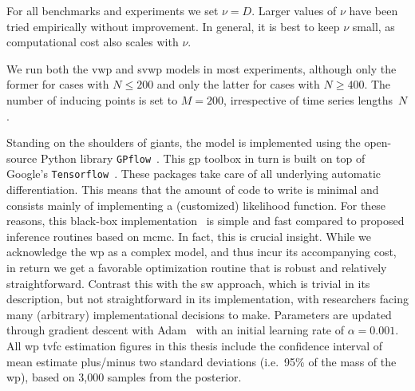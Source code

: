 For all benchmarks and experiments we set $\nu = D$.
Larger values of $\nu$ have been tried empirically without improvement.
In general, it is best to keep $\nu$ small, as computational cost also scales with $\nu$.

We run both the \gls{vwp} and \gls{svwp} models in most experiments, although only the former for cases with $N \leq 200$ and only the latter for cases with $N \geq 400$.
The number of inducing points is set to $M = 200$, irrespective of time series lengths~$N$.

Standing on the shoulders of giants, the model is implemented using the open-source Python library \texttt{GPflow}~\parencite[][version 2.6.4]{Matthews2017, Wilk2020}.
This \gls{gp} toolbox in turn is built on top of Google's \texttt{Tensorflow}~\parencite[][version 2.11.0]{Tensorflow2015}.
These packages take care of all underlying automatic differentiation.
This means that the amount of code to write is minimal and consists mainly of implementing a (customized) likelihood function.
For these reasons, this black-box implementation~\parencite{Ranganath2014} is simple and fast compared to proposed inference routines based on \gls{mcmc}.
%
In fact, this is crucial insight.
While we acknowledge the \gls{wp} as a complex model, and thus incur its accompanying cost, in return we get a favorable optimization routine that is robust and relatively straightforward.
Contrast this with the \gls{sw} approach, which is trivial in its description, but not straightforward in its implementation, with researchers facing many (arbitrary) implementational decisions to make.
Parameters are updated through gradient descent with Adam~\parencite{Kingma2015} with an initial learning rate of $\alpha = 0.001$.
All \gls{wp} \gls{tvfc} estimation figures in this thesis include the confidence interval of mean estimate plus/minus two standard deviations (i.e.~95\% of the mass of the \gls{wp}), based on 3,000 samples from the posterior.
